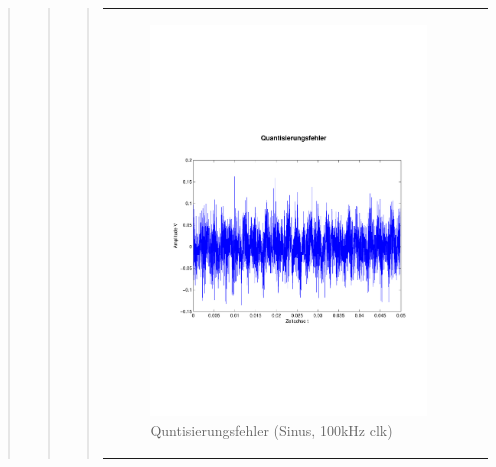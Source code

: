 \begin{quote}
\begin{quote}
\begin{quote}
            \begin{center}
                \begin{tabular}{ll}
                
                \hspace{-4cm}
                    
                    \begin{minipage}{0.55\textwidth}
                        \begin{figure}[H]
                            \includegraphics[scale=0.4, trim = 0cm 7cm 0cm
                            7.5cm, clip]
                            {./Bilder/sin100_Quantisierungsfehler}
                              \caption{Quntisierungsfehler (Sinus, 100kHz clk)}
                        \end{figure}
                    \end{minipage}
                                  

\end{tabular}
\end{center}
\end{quote}
\end{quote}
\end{quote}

